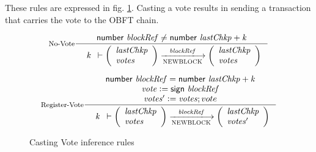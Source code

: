 These rules are expressed in fig. \ref{fig:casting-vote-rules}. Casting a vote results in sending a transaction that carries the vote to the OBFT chain.

\begin{figure}[htb]
  \begin{equation}\label{eq:no-vote}
    \inference[No-Vote]
    {
      \fun{number}~\var{blockRef} \neq \fun{number}~\var{lastChkp} + \var{k}\\
    }
    {
      \begin{array}{r}
        \var{k}
      \end{array}
      \vdash
      \left(
      \begin{array}{l}
        \var{lastChkp}\\
        \var{votes}\\
      \end{array}
      \right)
      \trans{NEWBLOCK}{\var{blockRef}}
      \left(
      \begin{array}{l}
        \var{lastChkp}\\
        \var{votes}\\
      \end{array}
      \right)
    }
  \end{equation}

  \nextdef

  \begin{equation}\label{eq:register-vote}
    \inference[Register-Vote]
    {
      \fun{number}~\var{blockRef} = \fun{number}~\var{lastChkp} + \var{k} \\
      \var{vote} \leteq \fun{sign}~\var{blockRef} \\
      \var{votes'} \leteq \var{votes};vote\\ 
    }
    {
      \begin{array}{r}
        \var{k}
      \end{array}
      \vdash
      \left(
      \begin{array}{l}
        \var{lastChkp}\\
        \var{votes}\\
      \end{array}
      \right)
      \trans{NEWBLOCK}{\var{blockRef}}
      \left(
      \begin{array}{l}
        \var{lastChkp}\\
        \var{votes'}\\
      \end{array}
      \right)
    }
  \end{equation}
  \caption{Casting Vote inference rules}
  \label{fig:casting-vote-rules}
\end{figure}



